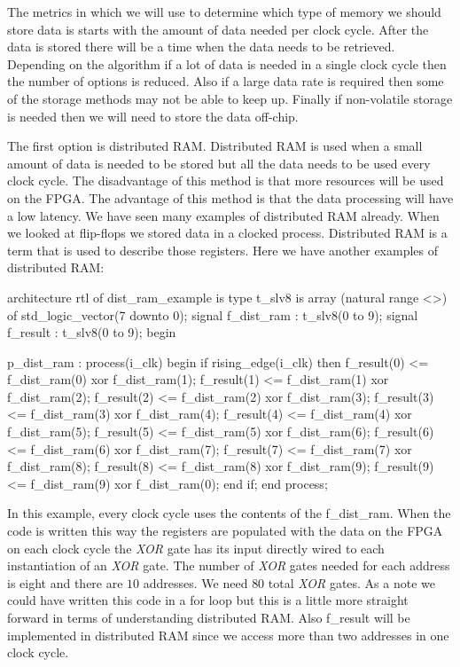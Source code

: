 The metrics in which we will use to determine which type of memory we should store data is starts with the amount of data needed per clock cycle. After the data is stored there will be a time when the data needs to be retrieved. Depending on the algorithm if a lot of data is needed in a single clock cycle then the number of options is reduced. Also if a large data rate is required then some of the storage methods may not be able to keep up. Finally if non-volatile storage is needed then we will need to store the data off-chip. 

The first option is distributed \ac{RAM}. Distributed \ac{RAM} is used when a small amount of data is needed to be stored but all the data needs to be used every clock cycle. The disadvantage of this method is that more resources will be used on the \ac{FPGA}. The advantage of this method is that the data processing will have a low latency. We have seen many examples of distributed \ac{RAM} already. When we looked at flip-flops we stored data in a clocked process. Distributed \ac{RAM} is a term that is used to describe those registers. Here we have another examples of distributed \ac{RAM}:

\begin{VHDLlisting}[tabsize=4]
architecture rtl of dist_ram_example is
    type t_slv8 is array (natural range <>) of std_logic_vector(7 downto 0);
    signal f_dist_ram : t_slv8(0 to 9);
    signal f_result   : t_slv8(0 to 9);
begin

p_dist_ram : process(i_clk)
begin
    if rising_edge(i_clk) then
        f_result(0) <= f_dist_ram(0) xor f_dist_ram(1);
        f_result(1) <= f_dist_ram(1) xor f_dist_ram(2);
        f_result(2) <= f_dist_ram(2) xor f_dist_ram(3);
        f_result(3) <= f_dist_ram(3) xor f_dist_ram(4);
        f_result(4) <= f_dist_ram(4) xor f_dist_ram(5);
        f_result(5) <= f_dist_ram(5) xor f_dist_ram(6);
        f_result(6) <= f_dist_ram(6) xor f_dist_ram(7);
        f_result(7) <= f_dist_ram(7) xor f_dist_ram(8);
        f_result(8) <= f_dist_ram(8) xor f_dist_ram(9);
        f_result(9) <= f_dist_ram(9) xor f_dist_ram(0);
    end if;
end process;
\end{VHDLlisting}

In this example, every clock cycle uses the contents of the f\_dist\_ram. When the code is written this way the registers are populated with the data on the \ac{FPGA} on each clock cycle the \emph{XOR} gate has its input directly wired to each instantiation of an \emph{XOR} gate. The number of \emph{XOR} gates needed for each address is eight and there are $10$ addresses. We need $80$ total \emph{XOR} gates. As a note we could have written this code in a for loop but this is a little more straight forward in terms of understanding distributed \ac{RAM}. Also f\_result will be implemented in distributed \ac{RAM} since we access more than two addresses in one clock cycle. 


